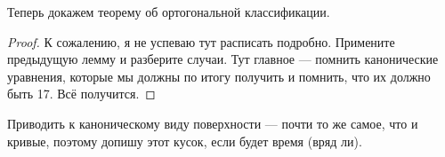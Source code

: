 Теперь докажем теорему об ортогональной классификации.

\begin{proof}
    К сожалению, я не успеваю тут расписать подробно. Примените предыдущую лемму и разберите случаи. Тут главное --- помнить канонические уравнения, которые мы должны по итогу получить и помнить, что их должно быть 17. Всё получится.
\end{proof}

Приводить к каноническому виду поверхности --- почти то же самое, что и кривые, поэтому допишу этот кусок, если будет время (вряд ли).


